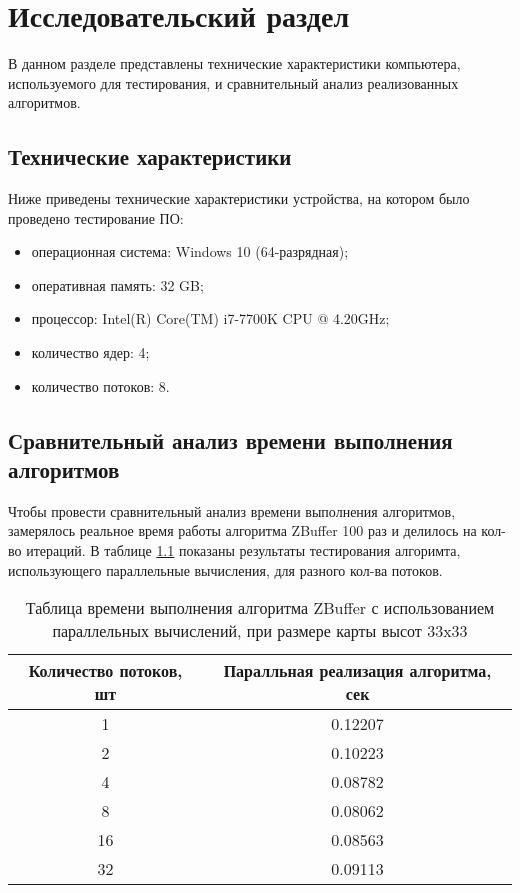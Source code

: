 \chapter{Исследовательский раздел}
В данном разделе представлены технические характеристики компьютера, используемого для тестирования, и сравнительный анализ реализованных алгоритмов.
 \section{Технические характеристики}

Ниже приведены технические характеристики устройства, на котором было проведено тестирование ПО:

\begin{itemize}
	\item операционная система: Windows 10 (64-разрядная);
	\item оперативная память: 32 GB;
	\item процессор: Intel(R) Core(TM) i7-7700K CPU @ 4.20GHz;
	\item количество ядер: 4;
	\item количество потоков: 8.
\end{itemize}

\section{Сравнительный анализ времени выполнения алгоритмов}
Чтобы провести сравнительный анализ времени выполнения алгоритмов, замерялось реальное время работы алгоритма ZBuffer 100 раз и делилось на кол-во итераций. В таблице \ref{ZBufferWithThreadsTable} показаны результаты тестирования алгоримта, использующего параллельные вычисления, для разного кол-ва потоков.

 \begin{table} [h!]
	\caption{Таблица времени выполнения алгоритма ZBuffer с использованием параллельных вычислений, при размере карты высот 33x33}
	\label{ZBufferWithThreadsTable}
	\begin{center}
		\begin{tabular}{|c c|} 
			\hline
			Количество потоков, шт & Паралльная реализация алгоритма, сек \\
			\hline
			1 & 0.12207\\
			\hline
			2 & 0.10223\\
			\hline
			4 & 0.08782\\
			\hline
			8 & 0.08062 \\
			\hline
			16 & 0.08563 \\
			\hline
			32 & 0.09113 \\
			\hline
		\end{tabular}
	\end{center}
\end{table}

